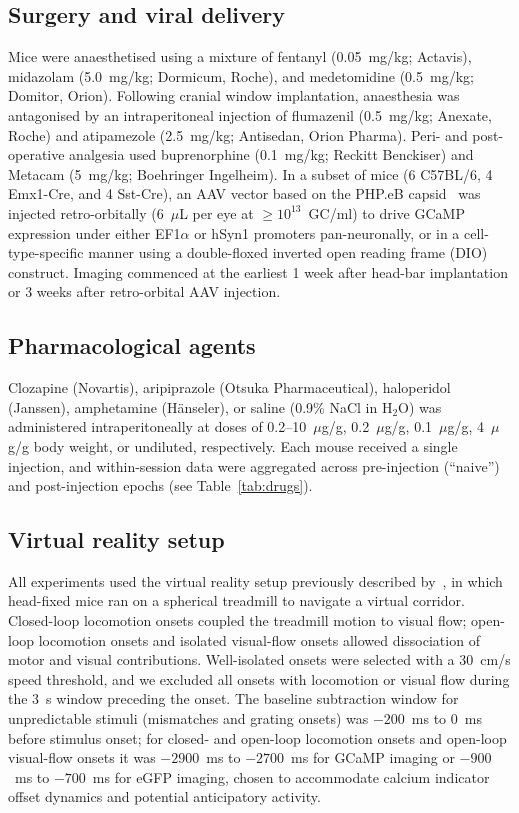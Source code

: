 \documentclass[11pt]{article}
\begin{document}
\subsection{Surgery and viral delivery}
Mice were anaesthetised using a mixture of fentanyl (0.05~mg/kg; Actavis), midazolam (5.0~mg/kg; Dormicum, Roche), and medetomidine (0.5~mg/kg; Domitor, Orion). Following cranial window implantation, anaesthesia was antagonised by an intraperitoneal injection of flumazenil (0.5~mg/kg; Anexate, Roche) and atipamezole (2.5~mg/kg; Antisedan, Orion Pharma). Peri- and post-operative analgesia used buprenorphine (0.1~mg/kg; Reckitt Benckiser) and Metacam (5~mg/kg; Boehringer Ingelheim). In a subset of mice (6 C57BL/6, 4 Emx1-Cre, and 4 Sst-Cre), an AAV vector based on the PHP.eB capsid~\citep{chan2017engineered} was injected retro-orbitally (6~$\mu$L per eye at $\geq 10^{13}$~GC/ml) to drive GCaMP expression under either EF1$\alpha$ or hSyn1 promoters pan-neuronally, or in a cell-type-specific manner using a double-floxed inverted open reading frame (DIO) construct. Imaging commenced at the earliest 1 week after head-bar implantation or 3 weeks after retro-orbital AAV injection.

\subsection{Pharmacological agents}
Clozapine (Novartis), aripiprazole (Otsuka Pharmaceutical), haloperidol (Janssen), amphetamine (H\"anseler), or saline (0.9\% NaCl in H$_2$O) was administered intraperitoneally at doses of 0.2--10~$\mu$g/g, 0.2~$\mu$g/g, 0.1~$\mu$g/g, 4~$\mu$g/g body weight, or undiluted, respectively. Each mouse received a single injection, and within-session data were aggregated across pre-injection (``naive'') and post-injection epochs (see Table~\ref{tab:drugs}).

\subsection{Virtual reality setup}
All experiments used the virtual reality setup previously described by~\citet{leinweber2017sensorimotor}, in which head-fixed mice ran on a spherical treadmill to navigate a virtual corridor. Closed-loop locomotion onsets coupled the treadmill motion to visual flow; open-loop locomotion onsets and isolated visual-flow onsets allowed dissociation of motor and visual contributions. Well-isolated onsets were selected with a 30~cm/s speed threshold, and we excluded all onsets with locomotion or visual flow during the 3~s window preceding the onset. The baseline subtraction window for unpredictable stimuli (mismatches and grating onsets) was $-200$~ms to 0~ms before stimulus onset; for closed- and open-loop locomotion onsets and open-loop visual-flow onsets it was $-2900$~ms to $-2700$~ms for GCaMP imaging or $-900$~ms to $-700$~ms for eGFP imaging, chosen to accommodate calcium indicator offset dynamics and potential anticipatory activity.
\end{document}
